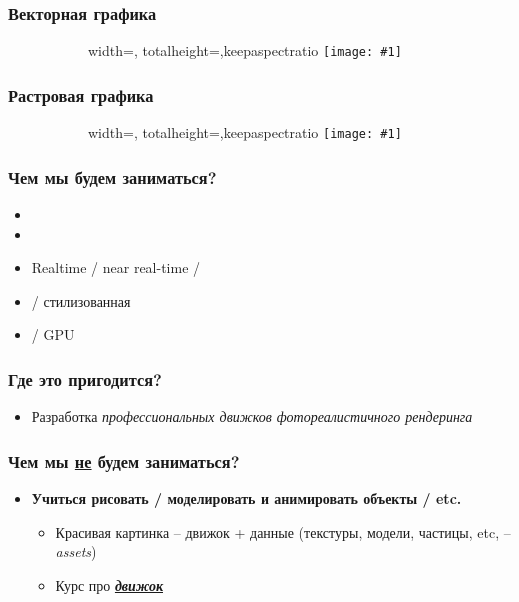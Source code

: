 \documentclass[10pt]{beamer}
\newcommand{\slideimage}[1]{
  \begin{figure}
    \begin{adjustbox}{width=\textwidth, totalheight=\textheight-2\baselineskip-2\baselineskip,keepaspectratio}
      \texttt{[image: \#1]}
    \end{adjustbox}
  \end{figure}
}
\begin{document}

\begin{frame}
\frametitle{Векторная графика}
\begin{figure}
\slideimage{vector.jpg}
\end{figure}
\end{frame}

\begin{frame}
\frametitle{Растровая графика}
\begin{figure}
\slideimage{raster.png}
\end{figure}
\end{frame}


\begin{frame}
\frametitle{Чем мы будем заниматься?}
\begin{itemize}
\item {}
\item {}
\item Realtime / near real-time / 
\item {} / стилизованная
\item {} / GPU
\end{itemize}
\end{frame}

\begin{frame}
\frametitle{Где это пригодится?}
\begin{itemize}
\pause
\item Разработка \textit{профессиональных движков фотореалистичного рендеринга}
\end{itemize}
\end{frame}

\begin{frame}
\frametitle{Чем мы \underline{не} будем заниматься?}
\begin{itemize}
\pause
\item \textbf{Учиться рисовать / моделировать и анимировать объекты / etc.}
\pause
\begin{itemize}
\item Красивая картинка -- движок + данные (текстуры, модели, частицы, etc, -- \textit{assets})
\item Курс про \alert{\textbf{\underline{\textit{движок}}}}
\end{itemize}
\end{itemize}
\end{frame}
\end{document}
